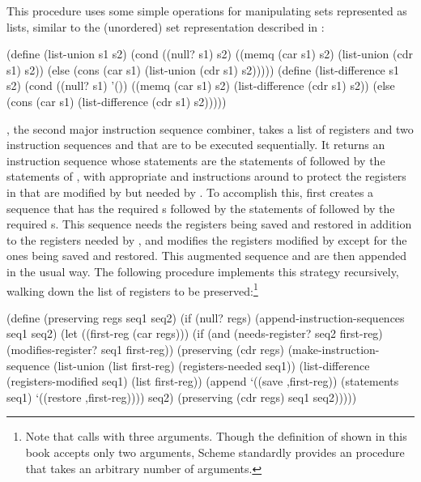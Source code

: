 \noindent
This procedure uses some simple operations for manipulating sets represented as
lists, similar to the (unordered) set representation described in
:

\begin{codeBlock}
(define (list-union s1 s2)
  (cond ((null? s1) s2)
        ((memq (car s1)
               s2)
         (list-union (cdr s1)
                     s2))
        (else (cons (car s1)
                    (list-union (cdr s1)
                                s2)))))
(define (list-difference s1 s2)
  (cond ((null? s1) '())
        ((memq (car s1)
               s2)
         (list-difference (cdr s1)
                          s2))
        (else
          (cons (car s1)
                (list-difference (cdr s1)
                                 s2)))))
\end{codeBlock}

\noindent
{}, the second major instruction sequence combiner, takes a list
of registers  and two instruction sequences  and
 that are to be executed sequentially.  It returns an instruction
sequence whose statements are the statements of  followed by the
statements of , with appropriate  and 
instructions around  to protect the registers in  that
are modified by  but needed by .  To accomplish this,
 first creates a sequence that has the required s
followed by the statements of  followed by the required
s.  This sequence needs the registers being saved and restored in
addition to the registers needed by , and modifies the registers
modified by  except for the ones being saved and restored.  This
augmented sequence and  are then appended in the usual way.  The
following procedure implements this strategy recursively, walking down the list
of registers to be preserved:\footnote{Note that  calls
 with three arguments.  Though the definition of 
shown in this book accepts only two arguments, Scheme standardly provides an
 procedure that takes an arbitrary number of arguments.}

\begin{codeBlock}
(define (preserving regs seq1 seq2)
  (if (null? regs)
      (append-instruction-sequences seq1 seq2)
      (let ((first-reg (car regs)))
        (if
          (and (needs-register? seq2 first-reg)
               (modifies-register? seq1 first-reg))
          (preserving
            (cdr regs)
            (make-instruction-sequence
              (list-union
                (list first-reg)
                (registers-needed seq1))
              (list-difference
                (registers-modified seq1)
                (list first-reg))
              (append
                `((save ,first-reg))
                (statements seq1)
                `((restore ,first-reg))))
            seq2)
          (preserving (cdr regs)
                      seq1
                      seq2)))))
\end{codeBlock}


